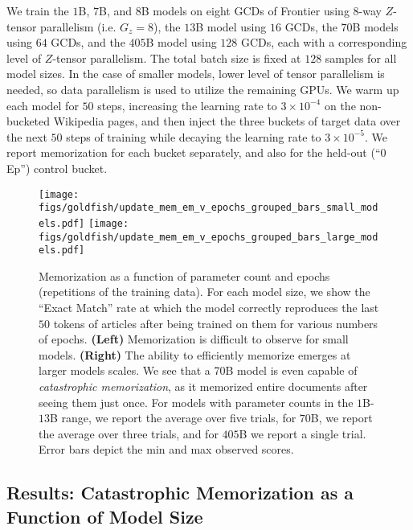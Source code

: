 We train the $1$B, $7$B, and $8$B models on eight GCDs of Frontier using
$8$-way $Z$-tensor parallelism (i.e. $G_{z}=8$), the $13$B model using $16$
GCDs, the $70$B models using $64$ GCDs, and the $405$B model using $128$ GCDs,
each with a corresponding level of $Z$-tensor parallelism. The total batch size
is fixed at $128$ samples for all model sizes. In the case of smaller models,
lower level of tensor parallelism is needed, so data parallelism is used to
utilize the remaining GPUs.  We warm up each model for $50$ steps, increasing
the learning rate to $3\times10^{-4}$ on the non-bucketed Wikipedia pages, and
then inject the three buckets of target data over the next $50$ steps of
training while decaying the learning rate to $3\times10^{-5}$. We report
memorization for each bucket separately, and also for the held-out (``$0$ Ep'')
control bucket.

\begin{figure*}[t]
	\centering
	\texttt{[image: figs/goldfish/update\_mem\_em\_v\_epochs\_grouped\_bars\_small\_models.pdf]}
	\texttt{[image: figs/goldfish/update\_mem\_em\_v\_epochs\_grouped\_bars\_large\_models.pdf]}
    \caption{Memorization as a function of parameter count and epochs
(repetitions of the training data). For each model size, we show the ``Exact
Match'' rate at which the model correctly reproduces the last $50$ tokens of
articles after being trained on them for various numbers of epochs.
\textbf{(Left)}  Memorization is difficult to observe for small models.
\textbf{(Right)} The ability to efficiently memorize emerges at larger models
scales.  We see that a 70B model is even capable of {\em catastrophic
memorization}, as it memorized entire documents after seeing them just once.
For models with parameter counts in the
$1$B-$13$B range, we report the average over five trials, for $70$B, we report
the average over three trials, and for $405$B we report a single trial. Error
bars depict the min and max observed scores.}
    \label{fig:mem-results}
\end{figure*}

\subsection{Results: Catastrophic Memorization as a Function of Model Size}

